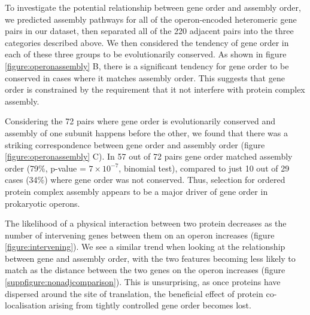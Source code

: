 \documentclass[a4paper,11pt,twoside,openright]{scrbook}
\begin{document}
To investigate the potential relationship between gene order and assembly order, we predicted assembly pathways for all of the operon-encoded heteromeric gene pairs in our dataset, then separated all of the 220 adjacent pairs into the three categories described above. We then considered the tendency of gene order in each of these three groups to be evolutionarily conserved. As shown in figure \ref{figure:operonassembly} B, there is a significant tendency for gene order to be conserved in cases where it matches assembly order. This suggests that gene order is constrained by the requirement that it not interfere with protein complex assembly.

Considering the 72 pairs where gene order is evolutionarily conserved and assembly of one subunit happens before the other, we found that there was a striking correspondence between gene order and assembly order (figure \ref{figure:operonassembly} C). In 57 out of 72 pairs gene order matched assembly order (79\%, p-value = \(7 \times 10^{-7}\), binomial test), compared to just 10 out of 29 cases (34\%) where gene order was not conserved. Thus, selection for ordered protein complex assembly appears to be a major driver of gene order in prokaryotic operons.

The likelihood of a physical interaction between two protein decreases as the number of intervening genes between them on an operon increases (figure \ref{figure:intervening}). We see a similar trend when looking at the relationship between gene and assembly order, with the two features becoming less likely to match as the distance between the two genes on the operon increases (figure \ref{suppfigure:nonadjcomparison}). This is unsurprising, as once proteins have dispersed around the site of translation, the beneficial effect of protein co-localisation arising from tightly controlled gene order becomes lost.
\end{document}
